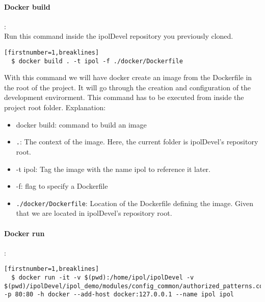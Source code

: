 \documentclass[a4paper,12pt]{article}
\begin{document}
\paragraph{Docker build}:\\

Run this command inside the ipolDevel repository you previously cloned.

\begin{verbatim}[firstnumber=1,breaklines]
  $ docker build . -t ipol -f ./docker/Dockerfile
\end{verbatim}

With this command we will have docker create an image from the Dockerfile in the root of the project. It will go through the creation and configuration of the development envirorment. This command has to be executed from inside the project root folder. Explanation:
\begin{itemize}
  \item docker build: command to build an image
  \item {\tt .}: The context of the image. Here, the current folder is ipolDevel's repository root.
  \item -t ipol: Tag the image with the name ipol to reference it later.
  \item -f: flag to specify a Dockerfile
  \item {\tt ./docker/Dockerfile}: Location of the Dockerfile defining the image. Given that we are located in ipolDevel's repository root.
\end{itemize}

\paragraph{Docker run}:\\
\begin{verbatim}[firstnumber=1,breaklines]
  $ docker run -it -v $(pwd):/home/ipol/ipolDevel -v $(pwd)/ipolDevel/ipol_demo/modules/config_common/authorized_patterns.conf.sample:/home/ipol/ipolDevel/ipol_demo/modules/config_common/authorized_patterns.conf -p 80:80 -h docker --add-host docker:127.0.0.1 --name ipol ipol
\end{verbatim}
\end{document}
